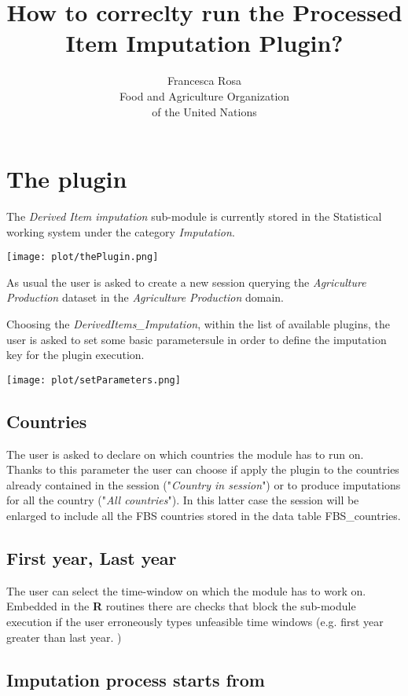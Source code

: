 \documentclass[nojss]{jss}
\title{\bf How to correclty run the Processed Item Imputation Plugin? }
\author{Francesca Rosa\\ Food and Agriculture
    Organization \\ of the United Nations\\}
\begin{document}

\SwaveParseOpstions


\section {The plugin}

The \textit{Derived Item imputation} sub-module is currently stored in the Statistical working system under the category \textit{Imputation}. 

\texttt{[image: plot/thePlugin.png]}

As usual the user is asked to create a new session querying the \textit{Agriculture Production} dataset in the \textit{Agriculture Production} domain.

Choosing the \textit{DerivedItems_Imputation}, within the list of available plugins, the user is asked to set some basic parametersule in order to define the imputation key for the plugin execution.

\texttt{[image: plot/setParameters.png]}

\subsection{ Countries}
The user is asked to declare on which countries the module has to run on. Thanks to this parameter the user can choose if apply the plugin to the countries already contained in the session ("\textit{Country in session}") or to produce imputations for all the country ("\textit{All countries}"). In this latter case the session will be enlarged to include all the FBS countries stored in the data table FBS_countries.

\subsection{First year, Last year}

The user can select the time-window on which the module has to work on. Embedded  in the \textbf{R} routines there are checks that block the sub-module execution if the user erroneously  types unfeasible time windows (e.g. first year greater than last year. )


\subsection{Imputation process starts from}
\end{document}
